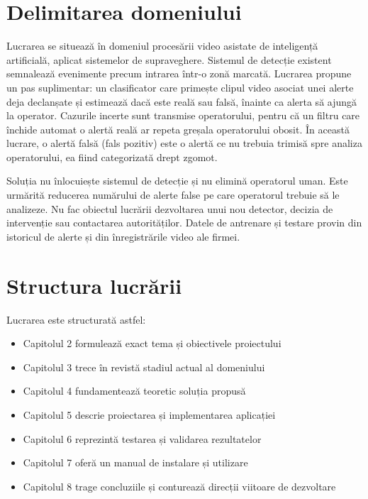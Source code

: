 \section{Delimitarea domeniului}

Lucrarea se situează în domeniul procesării video asistate
de inteligență artificială, aplicat sistemelor de supraveghere. Sistemul de detecție
existent semnalează evenimente precum intrarea într-o zonă marcată. 
Lucrarea propune un pas suplimentar: un clasificator care primește clipul
video asociat unei alerte deja declanșate și estimează dacă este reală sau falsă, 
înainte ca alerta să ajungă la operator. Cazurile incerte sunt transmise operatorului, 
pentru că un filtru care închide automat o alertă reală ar repeta greșala operatorului obosit.
În această lucrare, o alertă falsă (fals pozitiv) este o
alertă ce nu trebuia trimisă spre analiza operatorului, ea
fiind categorizată drept zgomot.

Soluția nu înlocuiește sistemul de detecție și nu elimină operatorul uman.
Este urmărită reducerea numărului de alerte false pe care operatorul
trebuie să le analizeze. Nu fac obiectul lucrării dezvoltarea unui nou detector, 
decizia de intervenție sau contactarea autorităților. Datele de antrenare
și testare provin din istoricul de alerte și din înregistrările video ale firmei.


\section{Structura lucrării}

Lucrarea este structurată astfel:
\begin{itemize}
    \item Capitolul 2 formulează exact tema și obiectivele proiectului
    \item Capitolul 3 trece în revistă stadiul actual al domeniului
    \item Capitolul 4 fundamentează teoretic soluția propusă
    \item Capitolul 5 descrie proiectarea și implementarea aplicației
    \item Capitolul 6 reprezintă testarea și validarea rezultatelor
    \item Capitolul 7 oferă un manual de instalare și utilizare
    \item Capitolul 8 trage concluziile și conturează direcții viitoare de dezvoltare
\end{itemize}


